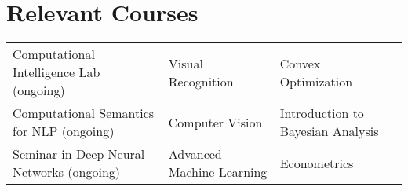 \section*{Relevant Courses}
\vspace{-1mm}
\begin{tabulary}{\textwidth}{L L L}
    Computational Intelligence Lab {\footnotesize (ongoing)}&
    Visual Recognition&
    Convex Optimization\\
    Computational Semantics for NLP {\footnotesize (ongoing)}&
    Computer Vision&
    Introduction to Bayesian Analysis\\
    Seminar in Deep Neural Networks {\footnotesize (ongoing)}&
    Advanced Machine Learning&
    Econometrics\\[-2mm]
\end{tabulary}
